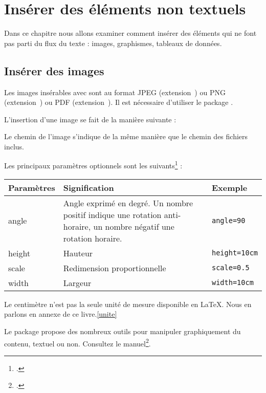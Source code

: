 \chapter{Insérer des éléments non textuels}

\begin{prealable}
	Dans ce chapitre nous allons examiner comment insérer des éléments qui ne font pas parti du flux du texte : images, graphismes, tableaux de données.
\end{prealable}

\section{Insérer des images}

Les images insérables avec \XeLaTeX sont au format JPEG (extension~) ou PNG (extension~) ou PDF (extension~). Il est nécessaire d'utiliser le package .


L'insertion d'une image se fait de la manière suivante : 

Le chemin de l'image s'indique de la même manière que le chemin des fichiers inclus.

Les principaux paramètres optionnels sont les suivants\footcite[Pour les autres, on consulter][]{graphicx_options} :

\begin{longtable}{|l|l|l|}
	\hline
	Paramètres & Signification & Exemple	\\
	\hline
	\endhead
	\hline
	\endfoot
	angle		& Angle exprimé en degré. Un nombre positif indique une rotation anti-horaire, un nombre négatif une rotation horaire. 	& \verb|angle=90| \\
	height		& Hauteur	& \verb|height=10cm|	 \\
	scale		& Redimension proportionnelle & \verb|scale=0.5|\\
	width		& Largeur 	& \verb|width=10cm| 	\\
\end{longtable}

\begin{plusloins}
Le centimètre n'est pas la seule  unité de mesure disponible en \LaTeX. Nous en parlons en annexe de ce livre.\ref{unite}
\end{plusloins}

\begin{plusloins}
Le package  propose des nombreux outils pour manipuler graphiquement du contenu, textuel ou non. Consultez le manuel\footcite{graphicx}.
\end{plusloins}


